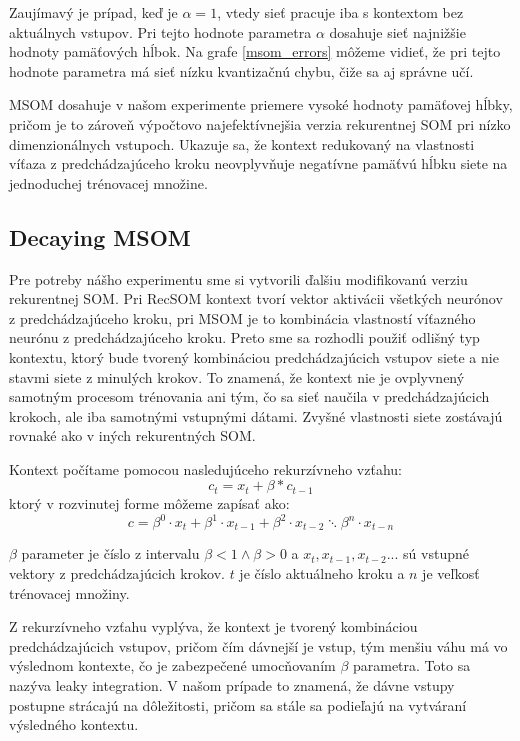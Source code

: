  Zaujímavý je prípad, keď je $\alpha = 1$, vtedy sieť pracuje iba s kontextom bez aktuálnych vstupov. 
 Pri tejto hodnote parametra $\alpha$
 dosahuje sieť najnižšie hodnoty pamäťových hĺbok.
 Na grafe \ref{msom_errors} môžeme vidieť, že pri tejto hodnote parametra má sieť nízku kvantizačnú chybu, čiže sa aj správne učí.

 MSOM dosahuje v našom experimente priemere vysoké hodnoty pamäťovej hĺbky, pričom je to zároveň 
 výpočtovo najefektívnejšia verzia rekurentnej SOM pri nízko dimenzionálnych vstupoch. 
 Ukazuje sa, že kontext redukovaný na vlastnosti víťaza z predchádzajúceho kroku neovplyvňuje negatívne pamäťvú hĺbku siete na jednoduchej trénovacej množine.

\subsection{Decaying MSOM}
Pre potreby nášho experimentu sme si vytvorili ďalšiu modifikovanú verziu %
rekurentnej SOM. Pri RecSOM kontext tvorí vektor aktivácii všetkých neurónov z predchádzajúceho kroku, 
pri MSOM je to kombinácia vlastností víťazného neurónu z predchádzajúceho kroku. 
Preto sme sa rozhodli použiť odlišný typ kontextu, ktorý bude tvorený kombináciou predchádzajúcich vstupov 
siete a nie stavmi siete z minulých krokov. To znamená, že kontext nie je ovplyvnený samotným procesom trénovania
ani tým, čo sa sieť naučila v predchádzajúcich krokoch, ale iba samotnými vstupnými dátami.
Zvyšné vlastnosti siete zostávajú rovnaké ako v iných rekurentných SOM.

Kontext počítame pomocou nasledujúceho rekurzívneho vzťahu:
\begin{equation}
    c_{t} = x_{t} + \beta * c_{t-1}
\end{equation}
ktorý v rozvinutej forme môžeme zapísať ako:
\begin{equation}
	c = \beta^{0} \cdot x_{t} + \beta^{1} \cdot x_{t-1} + 
	\beta^{2} \cdot x_{t-2} \ddots \beta^{n} \cdot x_{t-n}
\end{equation}

$\beta$ parameter je číslo z intervalu $\beta < 1 \wedge \beta > 0$ a
$x_t, x_{t-1}, x_{t-2} ...$ sú vstupné vektory z predchádzajúcich krokov.
$t$ je číslo aktuálneho kroku a $n$ je veľkosť trénovacej množiny.

Z rekurzívneho vzťahu vyplýva, že kontext je tvorený kombináciou predchádzajúcich vstupov,
pričom čím dávnejší je vstup, tým menšiu váhu má vo výslednom kontexte, čo je zabezpečené umocňovaním
$\beta$ parametra. Toto sa nazýva leaky integration. V našom prípade
to znamená, že dávne vstupy postupne strácajú na dôležitosti, pričom sa stále sa podieľajú 
na vytváraní výsledného kontextu.


